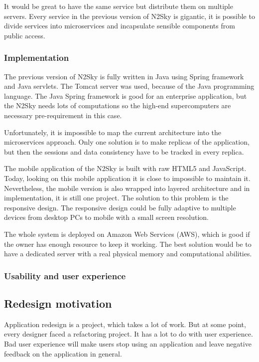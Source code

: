 It would be great to have the same service but distribute them on multiple servers. Every service in the previous version of N2Sky is gigantic, it is possible to divide services into microservices and incapsulate sensible components from public access.


\subsubsection{Implementation}\label{Implementation}

The previous version of N2Sky is fully written in Java using Spring framework and Java servlets. The Tomcat server was used, because of the Java programming language. The  Java Spring framework is good for an enterprise application, but the N2Sky needs lots of computations so the high-end supercomputers are necessary pre-requirement in this case. 

Unfortunately, it is impossible to map the current architecture into the microservices approach. Only one solution is to make replicas of the application, but then the sessions and data consistency have to be tracked in every replica. 

The mobile application of the N2Sky is built with raw HTML5 and JavaScript. Today, looking on this mobile application it is close to impossible to maintain it. Nevertheless,  the mobile version is also wrapped into layered architecture and in implementation, it is still one project. The solution to this problem is the responsive design. The responsive design could be fully adaptive to multiple devices from desktop PCs to mobile with a small screen resolution.

The whole system is deployed on Amazon Web Services (AWS), which is good if the owner has enough resource to keep it working. The best solution would be to have a dedicated server with a real physical memory and computational abilities.  


\subsubsection{Usability and user experience}\label{Usabilityanduserexperience}



\subsection{Redesign motivation}\label{Redesignmotivation}

Application redesign is a project, which takes a lot of work. But at some point, every designer faced a refactoring project. It has a lot to do with user experience. Bad user experience will make users stop using an application and leave negative feedback on the application in general. 

